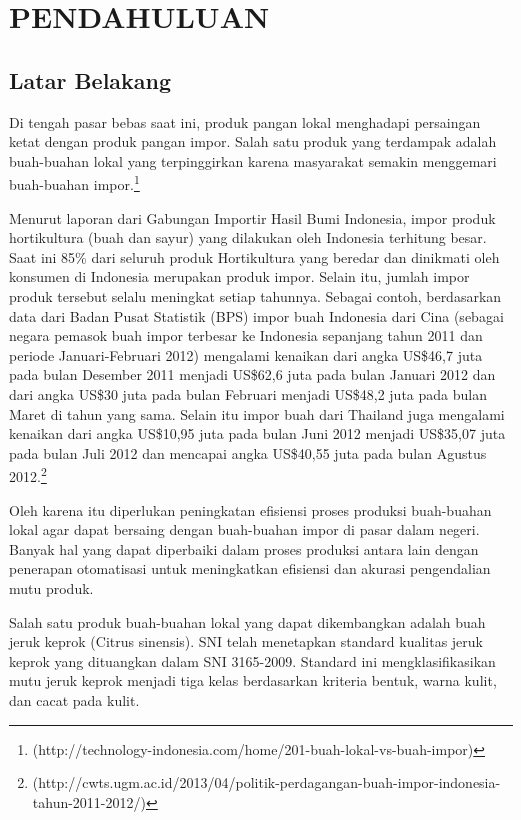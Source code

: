 \documentclass[laporan.tex]{subfiles}
\begin{document}
\chapter{PENDAHULUAN}

\section{Latar Belakang}

Di tengah pasar bebas saat ini, produk pangan lokal menghadapi persaingan ketat dengan produk pangan impor. Salah satu produk yang terdampak adalah buah-buahan lokal yang terpinggirkan karena masyarakat semakin menggemari buah-buahan impor.\footnote{(http://technology-indonesia.com/home/201-buah-lokal-vs-buah-impor)}

Menurut laporan dari Gabungan Importir Hasil Bumi Indonesia, impor produk hortikultura (buah dan sayur) yang dilakukan oleh Indonesia terhitung besar. Saat ini 85\% dari seluruh produk Hortikultura yang beredar dan dinikmati oleh konsumen di Indonesia merupakan produk impor. Selain itu, jumlah impor produk tersebut selalu meningkat setiap tahunnya. Sebagai contoh, berdasarkan data dari Badan Pusat Statistik (BPS) impor buah Indonesia dari Cina (sebagai negara pemasok buah impor terbesar ke Indonesia sepanjang tahun 2011 dan periode Januari‐Februari 2012) mengalami kenaikan dari angka US\$46,7 juta pada bulan Desember 2011 menjadi US\$62,6 juta pada bulan Januari 2012 dan dari angka US\$30 juta pada bulan Februari menjadi US\$48,2 juta pada bulan Maret di tahun yang sama. Selain itu impor buah dari Thailand juga mengalami kenaikan dari angka US\$10,95 juta pada bulan Juni 2012 menjadi US\$35,07 juta pada bulan Juli 2012 dan mencapai angka US\$40,55 juta pada bulan Agustus 2012.\footnote{(http://cwts.ugm.ac.id/2013/04/politik-perdagangan-buah-impor-indonesia-tahun-2011-2012/)}

Oleh karena itu diperlukan peningkatan efisiensi proses produksi buah-buahan lokal agar dapat bersaing dengan buah-buahan impor di pasar dalam negeri. Banyak hal yang dapat diperbaiki dalam proses produksi antara lain dengan penerapan otomatisasi untuk meningkatkan efisiensi dan akurasi pengendalian mutu produk.

Salah satu produk buah-buahan lokal yang dapat dikembangkan adalah buah jeruk keprok (Citrus sinensis). SNI telah menetapkan standard kualitas jeruk keprok yang dituangkan dalam SNI 3165-2009. Standard ini mengklasifikasikan mutu jeruk keprok menjadi tiga kelas berdasarkan kriteria  bentuk, warna kulit, dan cacat pada kulit.
\end{document}
